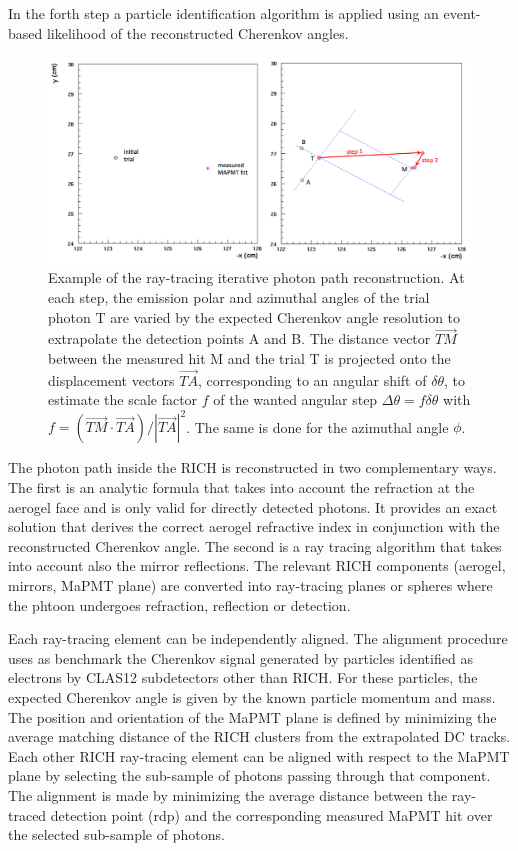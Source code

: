 \documentclass[final,5p,times,twocolumn]{elsarticle}
\def\MAPMT{MaPMT }
\begin{document}
In the forth step a particle identification algorithm is applied using an event-based likelihood
of the reconstructed Cherenkov angles.

\begin{figure}[t]
\begin{center}
\includegraphics[width=1.0\columnwidth]{EPS/Ray-trace.png}
\end{center}
\caption{Example of the ray-tracing iterative photon path reconstruction. At each step, the
emission polar and azimuthal angles of the trial photon T are varied by the expected Cherenkov angle resolution to 
extrapolate the detection points A and B. The distance vector $\vec{TM}$ between the measured hit M and the trial T is projected
onto the displacement vectors $\vec{TA}$, corresponding to an angular shift of $\delta \theta$, to estimate the scale factor 
$f$ of the wanted angular step $\Delta \theta = f \delta \theta$ with $f=(\vec{TM}\cdot \vec {TA}) / |\vec{TA}|^2$. The
same is done for the azimuthal angle $\phi$.} 
\label{Fig:RayAlgo}
\end{figure}

The photon path inside the RICH is reconstructed in two complementary ways. The first is an analytic formula that takes into account
the refraction at the aerogel face and is only valid for directly detected photons. It provides an 
exact solution that derives the correct aerogel refractive index in conjunction with the reconstructed
Cherenkov angle. The second is a ray tracing algorithm that takes into account also the mirror reflections.
The relevant RICH components (aerogel, mirrors, \MAPMT plane) are converted into ray-tracing planes or 
spheres where the phtoon undergoes refraction, reflection or detection. 

Each ray-tracing element can be independently aligned. The alignment procedure uses as benchmark the 
Cherenkov signal generated by particles identified as electrons by CLAS12 subdetectors other than RICH. 
For these particles, the expected Cherenkov angle is given by the known particle momentum and mass. The 
position and orientation of the \MAPMT plane is defined by minimizing the average matching distance of the
RICH clusters from the extrapolated DC tracks. Each other RICH ray-tracing element can be aligned with respect to the 
\MAPMT plane by selecting the sub-sample of photons passing through that component. The alignment is made by minimizing 
the average distance between the ray-traced detection point (rdp) and the corresponding measured \MAPMT hit over the 
selected sub-sample of photons.
\end{document}
